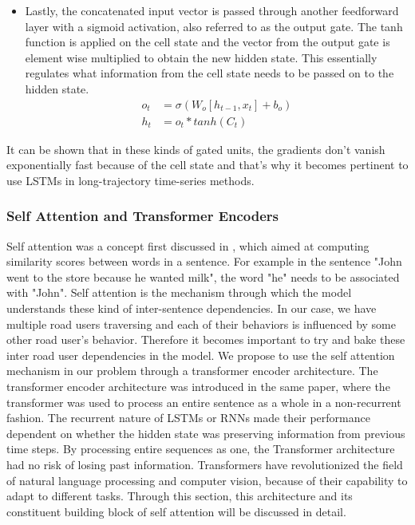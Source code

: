 \documentclass{article}
\begin{document}
\begin{itemize}
\begin{equation}
    \end{equation}
    \item Lastly, the concatenated input vector is passed through another feedforward layer with a sigmoid activation, also referred to as the output gate. The tanh function is applied on the cell state and the vector from the output gate is element wise multiplied to obtain the new hidden state. This essentially regulates what information from the cell state needs to be passed on to the hidden state.
    \begin{equation}
        \begin{split}
            o_t&=\sigma(W_o[h_{t-1},x_t]+b_o)\\
            h_t&=o_t*tanh(C_t)
        \end{split}
    \end{equation}
    
\end{itemize}

It can be shown that in these kinds of gated units, the gradients don't vanish exponentially fast because of the cell state and that's why it becomes pertinent to use LSTMs in long-trajectory time-series methods. 

\subsubsection{Self Attention and Transformer Encoders}\label{ssec:transformers_theory}
Self attention was a concept first discussed in \cite{vaswani_attention_2017}, which aimed at computing similarity scores between words in a sentence. For example in the sentence "John went to the store because he wanted milk", the word "he" needs to be associated with "John". Self attention is the mechanism through which the model understands these kind of inter-sentence dependencies. In our case, we have multiple road users traversing and each of their behaviors is influenced by some other road user's behavior. Therefore it becomes important to try and bake these inter road user dependencies in the model.  We propose to use the self attention mechanism in our problem through a transformer encoder architecture. The transformer encoder architecture was introduced in the same paper, where the transformer was used to process an entire sentence as a whole in a non-recurrent fashion. The recurrent nature of LSTMs or RNNs made their performance dependent on whether the hidden state was preserving information from previous time steps. By processing entire sequences as one, the Transformer architecture had no risk of losing past information. Transformers have revolutionized the field of natural language processing and computer vision, because of their capability to adapt to different tasks. Through this section, this architecture and its constituent building block of self attention will be discussed in detail. 
\end{document}
